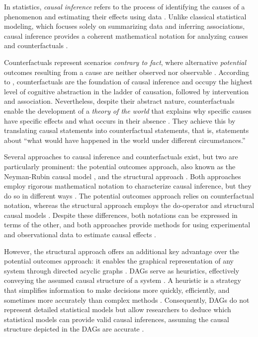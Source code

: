 \documentclass[
  authoryear,
  preprint,
  1p]{elsarticle}
\begin{document}
In statistics, \emph{causal inference} refers to the process of
identifying the causes of a phenomenon and estimating their effects
using data \citep{Shaughnessy_et_al_2010, Neal_2020}. Unlike classical
statistical modeling, which focuses solely on summarizing data and
inferring associations, causal inference provides a coherent
mathematical notation for analyzing causes and counterfactuals
\citep{Pearl_2009}.

Counterfactuals represent scenarios \emph{contrary to fact}, where
alternative \emph{potential} outcomes resulting from a cause are neither
observed nor observable \citep{Neal_2020, Counterfactual_2024}.
According to \citet{Pearl_et_al_2018}, counterfactuals are the
foundation of causal inference and occupy the highest level of cognitive
abstraction in the ladder of causation, followed by intervention and
association. Nevertheless, despite their abstract nature,
counterfactuals enable the development of a \emph{theory of the world}
that explains why specific causes have specific effects and what occurs
in their absence \citep{Pearl_et_al_2018}. They achieve this by
translating causal statements into counterfactual statements, that is,
statements about ``what would have happened in the world under different
circumstances.''

Several approaches to causal inference and counterfactuals exist, but
two are particularly prominent: the potential outcomes approach, also
known as the Neyman-Rubin causal model
\citep{Neyman_et_al_1923, Rubin_1974}, and the structural approach
\citep{Pearl_2009, Pearl_et_al_2016}. Both approaches employ rigorous
mathematical notation to characterize causal inference, but they do so
in different ways \citep{Neal_2020}. The potential outcomes approach
relies on counterfactual notation, whereas the structural approach
employs the do-operator and structural causal models
\citep[SCM,][]{Pearl_2009, Pearl_et_al_2016}. Despite these differences,
both notations can be expressed in terms of the other, and both
approaches provide methods for using experimental and observational data
to estimate causal effects \citep{Pearl_2010}.

However, the structural approach offers an additional key advantage over
the potential outcomes approach: it enables the graphical representation
of any system through directed acyclic graphs
\citep[DAG,][]{Gross_et_al_2018, Neal_2020}. DAGs serve as heuristics,
effectively conveying the assumed causal structure of a system
\citep{Pearl_et_al_2016}. A heuristic is a strategy that simplifies
information to make decisions more quickly, efficiently, and sometimes
more accurately than complex methods \citep{Chow_2015}. Consequently,
DAGs do not represent detailed statistical models but allow researchers
to deduce which statistical models can provide valid causal inferences,
assuming the causal structure depicted in the DAGs are accurate
\citep{McElreath_2020}.
\end{document}
